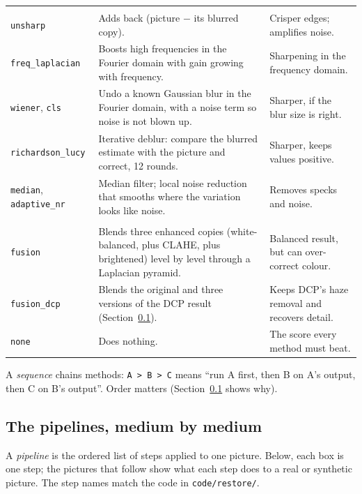 \documentclass[10pt,a4paper]{article}
\begin{document}
{\begin{longtable}{p{2.7cm}p{6.5cm}p{6.4cm}}
\addlinespace\multicolumn{3}{l}{\textbf{Sharpening and deblurring} (frequency or spatial)}\\
\texttt{unsharp} & Adds back (picture $-$ its blurred copy). & Crisper edges; amplifies noise.\\
\texttt{freq\_laplacian} & Boosts high frequencies in the Fourier domain with gain growing with frequency. & Sharpening in the frequency domain.\\
\texttt{wiener}, \texttt{cls} & Undo a known Gaussian blur in the Fourier domain, with a noise term so noise is not blown up. & Sharper, if the blur size is right.\\
\texttt{richardson\_lucy} & Iterative deblur: compare the blurred estimate with the picture and correct, 12 rounds. & Sharper, keeps values positive.\\
\texttt{median}, \texttt{adaptive\_nr} & Median filter; local noise reduction that smooths where the variation looks like noise. & Removes specks and noise.\\
\addlinespace\multicolumn{3}{l}{\textbf{Fusion}}\\
\texttt{fusion} & Blends three enhanced copies (white-balanced, plus CLAHE, plus brightened) level by level through a Laplacian pyramid. & Balanced result, but can over-correct colour.\\
\texttt{fusion\_dcp} & Blends the original and three versions of the DCP result (Section~\ref{sec:pipelines}). & Keeps DCP's haze removal and recovers detail.\\
\texttt{none} & Does nothing. & The score every method must beat.\\
\bottomrule
\end{longtable}}
A \emph{sequence} chains methods: \texttt{A > B > C} means ``run A first, then B on A's output, then C on B's output''. Order matters (Section~\ref{sec:pipelines} shows why).

\subsection{The pipelines, medium by medium}
\label{sec:pipelines}
A \emph{pipeline} is the ordered list of steps applied to one picture. Below, each box is one step; the pictures that follow show what each step does to a real or synthetic picture. The step names match the code in \texttt{code/restore/}.

\end{document}
